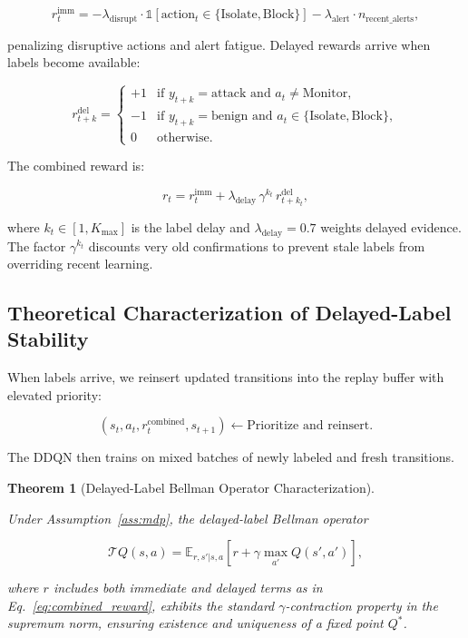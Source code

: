 \documentclass[preprint,12pt]{elsarticle}
\newtheorem{theorem}{Theorem}
\begin{document}
\[
r_t^{\text{imm}} = -\lambda_{\text{disrupt}} \cdot \mathbb{1}[\text{action}_t \in \{\text{Isolate}, \text{Block}\}] - \lambda_{\text{alert}} \cdot n_{\text{recent\_alerts}},
\]

penalizing disruptive actions and alert fatigue. Delayed rewards arrive when labels become available:

\[
r_{t+k}^{\text{del}} = \begin{cases}
+1 & \text{if } y_{t+k} = \text{attack} \text{ and } a_t \neq \text{Monitor}, \\
-1 & \text{if } y_{t+k} = \text{benign} \text{ and } a_t \in \{\text{Isolate}, \text{Block}\}, \\
0 & \text{otherwise}.
\end{cases}
\]

The combined reward is:

\begin{equation}
r_t = r_t^{\text{imm}} + \lambda_{\text{delay}} \, \gamma^{k_t} \, r_{t+k_t}^{\text{del}},
\label{eq:combined_reward}
\end{equation}

where $k_t \in [1, K_{\max}]$ is the label delay and $\lambda_{\text{delay}} = 0.7$ weights delayed evidence. The factor $\gamma^{k_t}$ discounts very old confirmations to prevent stale labels from overriding recent learning.

\subsection{Theoretical Characterization of Delayed-Label Stability}

When labels arrive, we reinsert updated transitions into the replay buffer with elevated priority:

\begin{equation}
(s_t, a_t, r_t^{\text{combined}}, s_{t+1}) \leftarrow \text{Prioritize and reinsert}.
\label{eq:replay_update}
\end{equation}

The DDQN then trains on mixed batches of newly labeled and fresh transitions.

\begin{theorem}[Delayed-Label Bellman Operator Characterization]
\label{thm:delayed_contraction}

Under Assumption~\ref{ass:mdp}, the delayed-label Bellman operator

\[
\mathcal{T}Q(s, a) = \mathbb{E}_{r, s' | s, a}[r + \gamma \max_{a'} Q(s', a')],
\]

where $r$ includes both immediate and delayed terms as in Eq.~\ref{eq:combined_reward}, exhibits the standard $\gamma$-contraction property in the supremum norm, ensuring existence and uniqueness of a fixed point $Q^*$.

\end{theorem}
\end{document}
